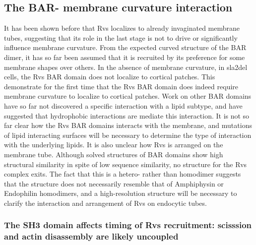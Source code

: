 \subsection{The BAR- membrane curvature interaction}
It has been shown before that Rvs localizes to already invaginated membrane tubes, suggesting that its role in the last stage is not to drive or significantly influence membrane curvature. From the expected curved structure of the BAR dimer, it has so far been assumed that it is recruited by its preference for some membrane shapes over others. In the absence of membrane curvature, in sla2del cells, the Rvs BAR domain does not localize to cortical patches. This demonstrate for the first time that the Rvs BAR domain does indeed require membrane curvature to localize to cortical patches. Work on other BAR domains have so far not discovered a specific interaction with a lipid subtype, and have suggested that hydrophobic interactions are mediate this interaction. It is not so far clear how the Rvs BAR domains interacts with the membrane, and mutations of lipid interacting surfaces will be necessary to determine the type of interaction with the underlying lipids. It is also unclear how Rvs is arranged on the membrane tube. Although solved structures of BAR domains show high structural similarity in spite of low sequence similarity, no structure for the Rvs complex exits. The fact that this is a hetero- rather than homodimer suggests that the structure does not necessarily resemble that of Amphiphysin or Endophilin homodimers, and a high-resolution structure will be necessary to clarify the interaction and arrangement of Rvs on endocytic tubes. 

\subsubsection{The SH3 domain affects timing of Rvs recruitment: scisssion and actin disassembly are likely uncoupled}


